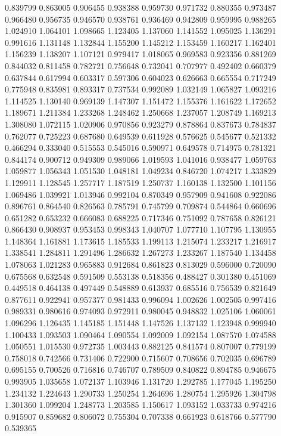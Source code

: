 0.839799
0.863005
0.906455
0.938388
0.959730
0.971732
0.880355
0.973487
0.966480
0.956735
0.946570
0.938761
0.936469
0.942809
0.959995
0.988265
1.024910
1.064101
1.098665
1.123405
1.137060
1.141552
1.095025
1.136291
0.991616
1.131148
1.132844
1.155200
1.145212
1.153459
1.160217
1.162401
1.156239
1.138207
1.107121
0.979417
1.018065
0.969583
0.923356
0.881269
0.844032
0.811458
0.782721
0.756648
0.732041
0.707977
0.492402
0.660379
0.637844
0.617994
0.603317
0.597306
0.604023
0.626663
0.665554
0.717249
0.775948
0.835981
0.893317
0.737534
0.992089
1.032149
1.065827
1.093216
1.114525
1.130140
0.969139
1.147307
1.151472
1.155376
1.161622
1.172652
1.189671
1.211384
1.233268
1.248462
1.250668
1.237057
1.208749
1.169213
1.308080
1.072115
1.020906
0.970856
0.923279
0.878864
0.837673
0.784837
0.762077
0.725223
0.687680
0.649539
0.611928
0.576625
0.545677
0.521332
0.466294
0.333040
0.515553
0.545016
0.590971
0.649578
0.714975
0.781321
0.844174
0.900712
0.949309
0.989066
1.019593
1.041016
0.938477
1.059763
1.059877
1.056343
1.051530
1.048181
1.049234
0.846720
1.074217
1.333829
1.129911
1.128545
1.257717
1.187519
1.250737
1.160138
1.132500
1.101156
1.069486
1.039921
1.013946
0.992104
0.870349
0.957909
0.941608
0.922086
0.896761
0.864540
0.826563
0.785791
0.745799
0.709874
0.544864
0.660696
0.651282
0.653232
0.666083
0.688225
0.717346
0.751092
0.787658
0.826121
0.866430
0.908937
0.953453
0.998343
1.040707
1.077710
1.107795
1.130955
1.148364
1.161881
1.173615
1.185533
1.199113
1.215074
1.233217
1.216917
1.338541
1.284811
1.291496
1.286632
1.267273
1.233267
1.187540
1.134458
1.078063
1.021283
0.965883
0.912684
0.861823
0.813029
0.596000
0.720090
0.675568
0.632548
0.591509
0.553138
0.518356
0.488427
0.301380
0.451069
0.449518
0.464138
0.497449
0.548889
0.613937
0.685516
0.756539
0.821649
0.877611
0.922941
0.957377
0.981433
0.996094
1.002626
1.002505
0.997416
0.989331
0.980616
0.974093
0.972911
0.980045
0.948832
1.025106
1.060061
1.096296
1.126435
1.145185
1.151448
1.147526
1.137132
1.123948
0.999940
1.100433
1.093503
1.090464
1.090554
1.092009
1.092154
1.087570
1.074588
1.050551
1.015530
0.972735
1.003443
0.882125
0.841574
0.807007
0.779199
0.758018
0.742566
0.731406
0.722900
0.715607
0.708656
0.702035
0.696789
0.695155
0.700526
0.716816
0.746707
0.789509
0.840822
0.894785
0.946675
0.993905
1.035658
1.072137
1.103946
1.131720
1.292785
1.177045
1.195250
1.234132
1.224643
1.290733
1.250254
1.264696
1.280754
1.295926
1.304798
1.301360
1.099204
1.248773
1.203585
1.150617
1.093152
1.033733
0.974216
0.915907
0.859682
0.806072
0.755304
0.707338
0.661923
0.618766
0.577790
0.539365
